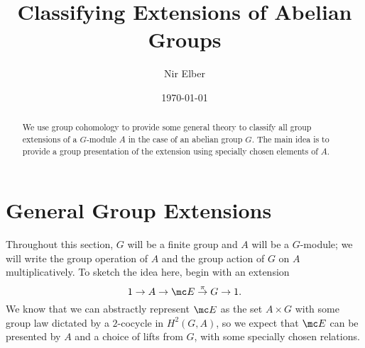 \documentclass{article}
\title{Classifying Extensions of Abelian Groups}
\author{Nir Elber}
\date{\today}
\numberwithin{equation}{section}
\begin{document}
\maketitle

\begin{abstract}
	\noindent We use group cohomology to provide some general theory to classify all group extensions of a $ G$-module $A$ in the case of an abelian group $ G$. The main idea is to provide a group presentation of the extension using specially chosen elements of $A$.
\end{abstract}

\setcounter{tocdepth}{4}
\tableofcontents

\section{General Group Extensions} \label{sec:general}
Throughout this section, $ G$ will be a finite group and $A$ will be a $ G$-module; we will write the group operation of $A$ and the group action of $ G$ on $A$ multiplicatively. To sketch the idea here, begin with an extension
\[1\to A\to\mc E\stackrel\pi\to G\to1.\]
We know that we can abstractly represent $\mc E$ as the set $A\times G$ with some group law dictated by a $2$-cocycle in $H^2(G,A)$, so we expect that $\mc E$ can be presented by $A$ and a choice of lifts from $ G$, with some specially chosen relations.
\end{document}
